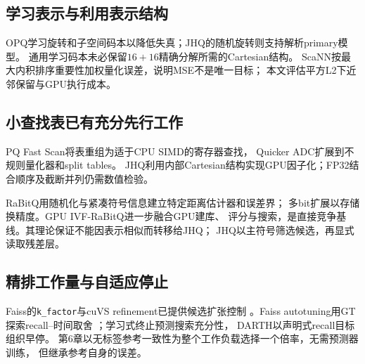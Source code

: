 \subsection{学习表示与利用表示结构}
OPQ学习旋转和子空间码本以降低失真\cite{opq}；JHQ的随机旋转则支持解析primary模型。
通用学习码本未必保留$16+16$精确分解所需的Cartesian结构。
ScaNN按最大内积排序重要性加权量化误差\cite{scann}，说明MSE不是唯一目标；
本文评估平方L2下近邻保留与GPU执行成本。

\subsection{小查找表已有充分先行工作}
PQ Fast Scan将表重组为适于CPU SIMD的寄存器查找\cite{fastscan}，
Quicker ADC扩展到不规则量化器和split tables\cite{quickeradc}。
JHQ利用内部Cartesian结构实现GPU因子化；FP32结合顺序及截断并列仍需数值检验。

RaBitQ用随机化与紧凑符号信息建立特定距离估计器和误差界\cite{rabitq}；
多bit扩展以存储换精度\cite{rabitq_multi}。GPU IVF-RaBitQ进一步融合GPU建库、
评分与搜索\cite{ivfrabitq}，是直接竞争基线。其理论保证不能因表示相似而转移给JHQ；
JHQ以主符号筛选候选，再显式读取残差层。

\subsection{精排工作量与自适应停止}
Faiss的\texttt{k\_factor}与cuVS refinement已提供候选扩张控制
\cite{faiss_refine,cuvs_refinement}。Faiss autotuning用GT探索recall--时间取舍
\cite{faiss_autotune}；学习式终止预测搜索充分性\cite{li_termination}，
DARTH以声明式recall目标组织早停\cite{darth}。
第6章以无标签参考一致性为整个工作负载选择一个倍率，无需预测器训练，
但继承参考自身的误差。
